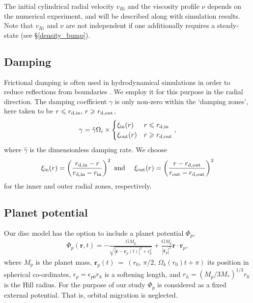 The initial cylindrical radial velocity $v_{Ri}$ and the viscosity
profile $\nu$ depends on the numerical experiment, and will be
described along with simulation results. Note that $v_{Ri}$ and $\nu$
are not independent if one additionally requires a steady-state (see
\S\ref{density_bump}).    

\subsection{Damping}
Frictional damping is often used in hydrodynamical simulations in order
to reduce reflections from boundaries
\citep[e.g.][]{bate02,valborro07}. We employ it for this  
purpose in the radial direction. The damping coefficient $\gamma$ is only 
non-zero within the `damping zones', here taken to be $r\leqslant r_\mathrm{d,in},\, 
r\geqslant r_\mathrm{d,out}$, 
\begin{align}
  \gamma = \hat{\gamma}\Omega_i\times
  \begin{cases}
    \xi_\mathrm{in}(r) & r\leqslant r_\mathrm{d,in} \\
    \xi_\mathrm{out}(r) & r\geqslant r_\mathrm{d,out} \\
  \end{cases},
\end{align}
where $\hat{\gamma}$ is the dimensionless damping rate. We choose
\begin{align}
\xi_\mathrm{in}(r) = \left(\frac{r_\mathrm{d,in} - r}{r_\mathrm{d,in} - r_\mathrm{in}}\right)^2 \text{ and } \quad
\xi_\mathrm{out}(r) = \left(\frac{r - r_\mathrm{d,out}}{r_\mathrm{out}- r_\mathrm{d,out}}\right)^2
\end{align}
for the inner and outer radial zones, respectively. 

\subsection{Planet potential}\label{planet}
Our disc model has the option to include a planet potential $\Phi_p$,
\begin{align}
  \Phi_p(\bm{r},t) = -\frac{GM_p}{\sqrt{|\bm{r}-\bm{r}_p(t)|^2 +
      \epsilon^2_p}} + \frac{GM_p}{|\bm{r}_p|^3}\bm{r}\cdot\bm{r}_p,
\end{align}
where $M_p$ is the planet mass,
$\bm{r}_p(t)~=~(r_0,\,\pi/2,\,\Omega_k(r_0)t+\pi)$ its position in
spherical co-ordinates, $\epsilon_p = \epsilon_{p0}r_h$ is a
softening length, and $r_h=(M_p/3M_*)^{1/3}r_0$ is the Hill radius. 
For the purpose of our study $\Phi_p$ is considered as a 
fixed external potential. That is, orbital migration is neglected. 
